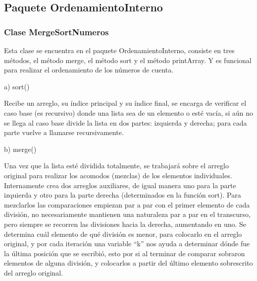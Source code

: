 \documentclass[11pt]{article}
\begin{document}
\subsection{Paquete OrdenamientoInterno}
\subsubsection{Clase MergeSortNumeros}
\par
Esta clase se encuentra en el paquete OrdenamientoInterno, consiste en tres métodos, el método merge, el método sort y el método printArray. Y es funcional para realizar el ordenamiento de los números de cuenta.
\par
a)	sort()
\par
Recibe un arreglo, su índice principal y su índice final, se encarga de verificar el caso base (es recursivo) donde una lista sea de un elemento o esté vacía, si aún no se llega al caso base divide la lista en dos partes: izquierda y derecha; para cada parte vuelve a llamarse recursivamente.
\par
b)	merge()
\par
Una vez que la lista esté dividida totalmente, se trabajará sobre el arreglo original para realizar los acomodos (mezclas) de los elementos individuales. Internamente crea dos arreglos auxiliares, de igual manera uno para la parte izquierda y otro para la parte derecha (determinados en la función sort). Para mezclarlos las comparaciones empiezan par a par con el primer elemento de cada división, no necesariamente mantienen una naturaleza par a par en el transcurso, pero siempre se recorren las divisiones hacia la derecha, aumentando en uno. Se determina cuál elemento de qué división es menor, para colocarlo en el arreglo original, y por cada iteración una variable “k” nos ayuda a determinar dónde fue la última posición que se escribió, esto por si al terminar de comparar sobraron elementos de alguna división, y colocarlos a partir del último elemento sobrescrito del arreglo original.
\end{document}
